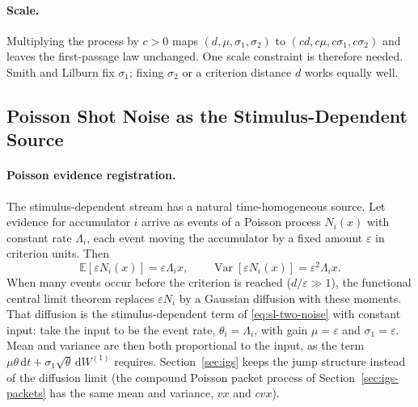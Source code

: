 \documentclass[12pt]{article}
\newcommand{\dd}{\,\mathrm{d}}
\begin{document}
\paragraph{Scale.}
Multiplying the process by $c>0$ maps $(d,\mu,\sigma_1,\sigma_2)$ to $(cd,c\mu,c\sigma_1,c\sigma_2)$ and leaves the first-passage law unchanged. One scale constraint is therefore needed. Smith and Lilburn fix $\sigma_1$; fixing $\sigma_2$ or a criterion distance $d$ works equally well.

\subsection{Poisson Shot Noise as the Stimulus-Dependent Source}
\label{sec:baseline-poisson}
\paragraph{Poisson evidence registration.}
The stimulus-dependent stream has a natural time-homogeneous source. Let evidence for accumulator $i$ arrive as events of a Poisson process $N_i(x)$ with constant rate $\Lambda_i$, each event moving the accumulator by a fixed amount $\varepsilon$ in criterion units. Then
\begin{equation}
  \mathbb E[\varepsilon N_i(x)]=\varepsilon\Lambda_i x,
  \qquad
  \operatorname{Var}[\varepsilon N_i(x)]=\varepsilon^2\Lambda_i x .
\end{equation}
When many events occur before the criterion is reached ($d/\varepsilon\gg1$), the functional central limit theorem replaces $\varepsilon N_i$ by a Gaussian diffusion with these moments. That diffusion is the stimulus-dependent term of
\eqref{eq:sl-two-noise} with constant input: take the input to be the event
rate, $\theta_i=\Lambda_i$, with gain $\mu=\varepsilon$ and $\sigma_1=\varepsilon$. Mean and variance are then both proportional to the input, as the term $\mu\theta\dd t+\sigma_1\sqrt\theta\dd W^{(1)}$ requires. Section~\ref{sec:igs} keeps the jump structure instead of the diffusion limit (the compound Poisson packet process of Section~\ref{sec:igs-packets} has the same mean and variance, $vx$ and $cvx$).
\end{document}
